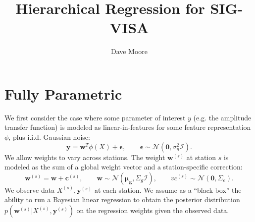 \documentclass{article}
\newcommand{\N}{\mathcal{N}}
\newcommand{\I}{\mathcal{I}}
\renewcommand{\v}[1]{\mathbf{#1}}
\begin{document}
\title{Hierarchical Regression for SIG-VISA}
\author{Dave Moore}
\maketitle

\section{Fully Parametric}

We first consider the case where some parameter of interest $y$ (e.g. the amplitude transfer function) is modeled as linear-in-features for some feature representation $\phi$, plus i.i.d. Gaussian noise:
\[\v{y} = \v{w}^T\phi(X) + \v{\epsilon}, \qquad \v{\epsilon} \sim \N(\v{0}, \sigma^2_n \I).\]
We allow weights to vary across stations. The weight $\v{w}^{(s)}$ at station $s$ is modeled as the sum of a global weight vector and a station-specific correction:
\[\v{w}^{(s)} = \v{w} + \v{c}^{(s)}, \qquad \v{w}\sim\N(\v{\mu_g}, \Sigma_g \I), \qquad v{c}^{(s)} \sim \N(\v{0}, \Sigma_e).\]
We observe data $X^{(s)}, \v{y}^{(s)}$ at each station. We assume as a ``black box'' the ability to run a Bayesian linear regression to obtain the posterior distribution $p(\v{w}^{(s)} | X^{(s)}, \v{y}^{(s)})$ on the regression weights given the observed data. 












\end{document}
